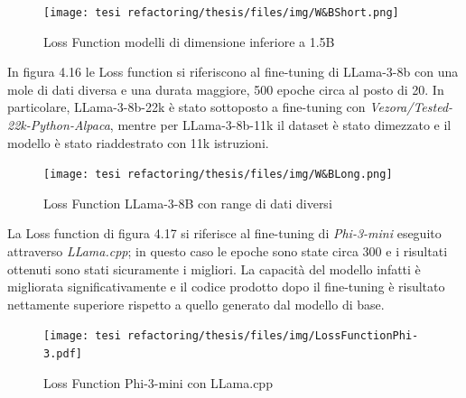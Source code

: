     \begin{figure}[htp]
        \centering
        \texttt{[image: tesi refactoring/thesis/files/img/W\&BShort.png]}
        \caption{Loss Function modelli di dimensione inferiore a 1.5B}
        \label{fig:entanglement}
    \end{figure}

In figura 4.16 le Loss function si riferiscono al fine-tuning di LLama-3-8b con una mole di dati diversa e una durata maggiore, 500 epoche circa al posto di 20. In particolare, LLama-3-8b-22k è stato sottoposto a fine-tuning con \textit{Vezora/Tested-22k-Python-Alpaca}, mentre per LLama-3-8b-11k il dataset è stato dimezzato e il modello è stato riaddestrato con 11k istruzioni.
    
    \begin{figure}[htp]
        \centering
        \texttt{[image: tesi refactoring/thesis/files/img/W\&BLong.png]}
        \caption{Loss Function LLama-3-8B con range di dati diversi}
        \label{fig:entanglement}
    \end{figure}
    \newpage 
La Loss function di figura 4.17 si riferisce al \gls{fine-tuning} di \textit{Phi-3-mini} eseguito attraverso \textit{LLama.cpp}; in questo caso le epoche sono state circa 300 e i risultati ottenuti sono stati sicuramente i migliori.
La capacità del modello infatti è migliorata significativamente e il codice prodotto dopo il \gls{fine-tuning} è risultato nettamente superiore rispetto a quello generato dal modello di base.
      \begin{figure}[htp]
        \centering
        \texttt{[image: tesi refactoring/thesis/files/img/LossFunctionPhi-3.pdf]}
        \caption{Loss Function Phi-3-mini con LLama.cpp}
        \label{fig:entanglement}
    \end{figure}
    \newpage
